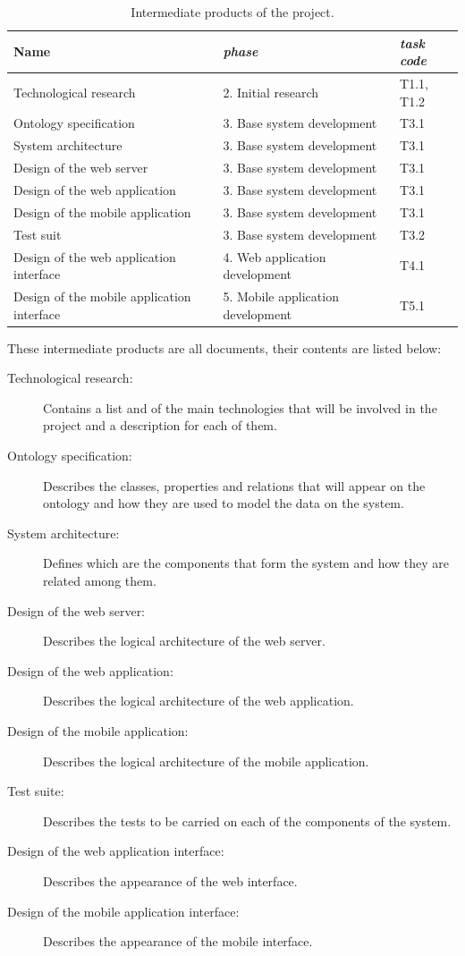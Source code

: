 \begin{table}[ht]
  \centering
  \caption{Intermediate products of the project.}\label{tab:intermediate-products}
  \begin{tabular}{lll}
    \toprule
      \textbf{Name} & \emph{phase}  & \emph{task code}\\
    \midrule
      Technological research & 2. Initial research & T1.1, T1.2 \\
      Ontology specification & 3. Base system development & T3.1 \\
      System architecture & 3. Base system development & T3.1 \\
      Design of the web server & 3. Base system development & T3.1 \\
      Design of the web application & 3. Base system development & T3.1 \\
      Design of the mobile application & 3. Base system development & T3.1 \\
      Test suit & 3. Base system development & T3.2 \\
      Design of the web application interface & 4. Web application development & T4.1 \\
      Design of the mobile application interface & 5. Mobile application development & T5.1 \\
    \bottomrule
  \end{tabular}
\end{table}

These intermediate products are all documents, their contents are listed below:

\begin{description}
\item[Technological research:] Contains a list and of the main technologies that will be involved in the project and a description for each of them.
\item[Ontology specification:] Describes the classes, properties and relations that will appear on the ontology and how they are used to model the data on the system.
\item[System architecture:] Defines which are the components that form the system and how they are related among them.
\item[Design of the web server:] Describes the logical architecture of the web server.
\item[Design of the web application:] Describes the logical architecture of the web application.
\item[Design of the mobile application:] Describes the logical architecture of the mobile application.
\item[Test suite:] Describes the tests to be carried on each of the components of the system.
\item[Design of the web application interface:] Describes the appearance of the web interface.
\item[Design of the mobile application interface:] Describes the appearance of the mobile interface.
\end{description}

